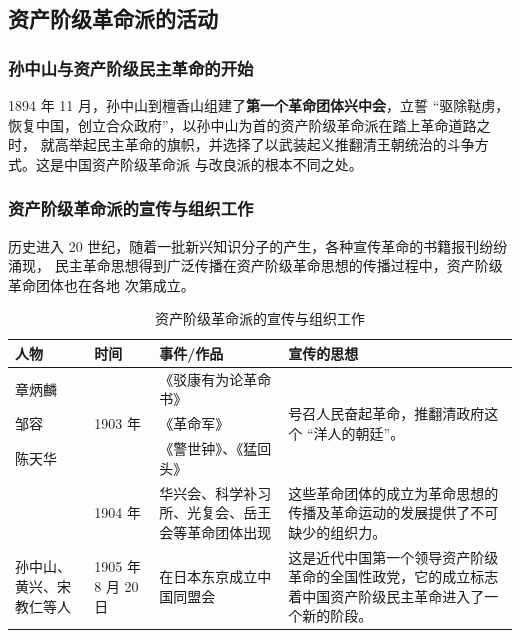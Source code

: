 \documentclass[10pt, UTF8]{book} %
\begin{document}
\subsection{资产阶级革命派的活动}

\subsubsection{孙中山与资产阶级民主革命的开始}

1894 年 11 月，孙中山到檀香山组建了\textbf{第一个革命团体兴中会}，立誓
“驱除鞑虏，恢复中国，创立合众政府”，以孙中山为首的资产阶级革命派在踏上革命道路之时，
就高举起民主革命的旗帜，并选择了以武装起义推翻清王朝统治的斗争方式。这是中国资产阶级革命派
与改良派的根本不同之处。




\subsubsection{资产阶级革命派的宣传与组织工作}

历史进入 20 世纪，随着一批新兴知识分子的产生，各种宣传革命的书籍报刊纷纷涌现，
民主革命思想得到广泛传播在资产阶级革命思想的传播过程中，资产阶级革命团体也在各地
次第成立。

\begin{table}[H]
    \centering
    \caption{资产阶级革命派的宣传与组织工作}
    \begin{tabular}{p{}|p{}|p{}|p{}}
        \toprule
        人物 & 时间 & 事件/作品 & 宣传的思想 \\ 
        \hline
        章炳麟 & \multirow{3}{*}{1903 年} & 《驳康有为论革命书》
        & \multirow{3}{0.3\textwidth}{号召人民奋起革命，推翻清政府这个 “洋人的朝廷”。}\\
        邹容 &  & 《革命军》&\\
        陈天华 & & 《警世钟》、《猛回头》&\\
        \hline
        & 1904 年 & 华兴会、科学补习所、光复会、岳王会等革命团体出现 &
        这些革命团体的成立为革命思想的传播及革命运动的发展提供了不可缺少的组织力。 \\
        \hline
        孙中山、黄兴、宋教仁等人 & 1905 年 8 月 20 日 & 在日本东京成立中国同盟会 
        & 这是近代中国第一个领导资产阶级
        革命的全国性政党，它的成立标志着中国资产阶级民主革命进入了一个新的阶段。 \\
        \bottomrule
    \end{tabular}    
\end{table}
\end{document}
